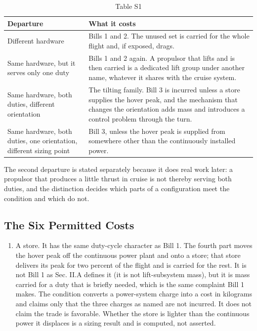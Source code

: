\documentclass[journal]{new-aiaa}
\begin{document}
\begin{table}[htbp]
\centering
\caption*{Table S1}
\small
\begin{tabularx}{\linewidth}{XX}
\hline
Departure & What it costs \\ \hline
Different hardware & Bills 1 and 2. The unused set is carried for the whole flight and, if exposed, drags. \\
Same hardware, but it serves only one duty & Bills 1 and 2 again. A propulsor that lifts and is then carried is a dedicated lift group under another name, whatever it shares with the cruise system. \\
Same hardware, both duties, different orientation & The tilting family. Bill 3 is incurred unless a store supplies the hover peak, and the mechanism that changes the orientation adds mass and introduces a control problem through the turn. \\
Same hardware, both duties, one orientation, different sizing point & Bill 3, unless the hover peak is supplied from somewhere other than the continuously installed power. \\
\hline
\end{tabularx}
\end{table}

The second departure is stated separately because it does real work later: a propulsor that produces a little thrust in cruise is not thereby serving both duties, and the distinction decides which parts of a configuration meet the condition and which do not.

\subsection*{The Six Permitted Costs}

\begin{enumerate}[label=\arabic*)]
\item A store. It has the same duty-cycle character as Bill 1. The fourth part moves the hover peak off the continuous power plant and onto a store; that store delivers its peak for two percent of the flight and is carried for the rest. It is not Bill 1 as Sec. II.A defines it (it is not lift-subsystem mass), but it is mass carried for a duty that is briefly needed, which is the same complaint Bill 1 makes. The condition converts a power-system charge into a cost in kilograms and claims only that the three charges as named are not incurred. It does not claim the trade is favorable. Whether the store is lighter than the continuous power it displaces is a sizing result and is computed, not asserted.
\end{enumerate}
\end{document}
